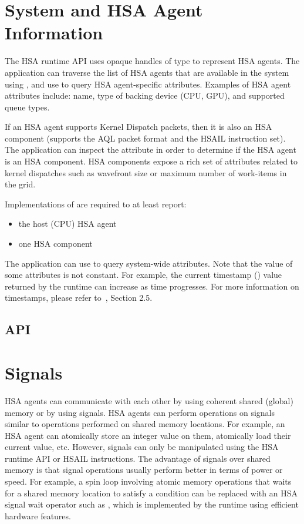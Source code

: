 \documentclass[final,oneside]{book}
\begin{document}
\section{System and HSA Agent Information}
\label{sec:agentinfo}

The HSA runtime API uses opaque handles of type  to
represent HSA agents. The application can traverse the list of HSA agents that
are available in the system using , and use
 to query HSA agent-specific attributes. Examples of
HSA agent attributes include: name, type of backing device (CPU, GPU), and
supported queue types.

If an HSA agent supports Kernel Dispatch packets, then it is also an HSA
component (supports the AQL packet format and the HSAIL instruction set). The
application can inspect the  attribute in order
to determine if the HSA agent is an HSA component. HSA components expose a rich
set of attributes related to kernel dispatches such as wavefront size or maximum
number of work-items in the grid.

Implementations of  are required to at least report:
\begin{itemize}[itemsep=1pt,topsep=3pt,partopsep=0pt]
\item the host (CPU) HSA agent
\item one HSA component
\end{itemize}

The application can use  to query system-wide
attributes. Note that the value of some attributes is not constant. For example,
the current timestamp () value returned by the
runtime can increase as time progresses. For more information on timestamps,
please refer to~\cite{sar}, Section 2.5.

\subsection{API}


\section{Signals}\label{sec:signals}

HSA agents can communicate with each other by using coherent shared (global)
memory or by using signals. HSA agents can perform operations on signals similar
to operations performed on shared memory locations. For example, an HSA agent
can atomically store an integer value on them, atomically load their current
value, etc. However, signals can only be manipulated using the HSA runtime API
or HSAIL instructions. The advantage of signals over shared memory is that
signal operations usually perform better in terms of power or speed. For
example, a spin loop involving atomic memory operations that waits for a shared
memory location to satisfy a condition can be replaced with an HSA signal wait
operator such as , which is implemented by the
runtime using efficient hardware features.
\end{document}
